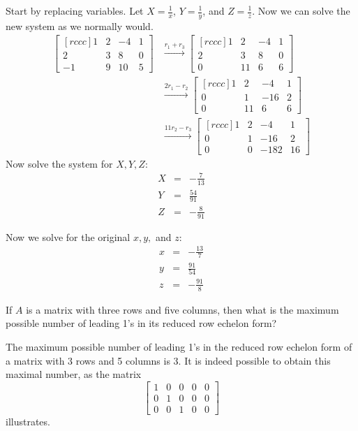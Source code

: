 \begin{solution}
Start by replacing variables.  Let $X = \frac{1}{x}$, $Y = \frac{1}{y}$, and $Z = \frac{1}{z}.$ Now we can solve the new system as we normally would.
\newline
\begin{eqnarray*}
\begin{bmatrix}[rccc]
1&2&-4&1\\
2&3&8&0\\
-1&9&10&5
\end{bmatrix}
&\xrightarrow[]{r_1 + r_3}
\begin{bmatrix}[rccc]
1&2&-4&1\\
2&3&8&0\\
0&11&6&6
\end{bmatrix}\\
&\xrightarrow[]{2r_1 - r_2}
\begin{bmatrix}[rccc]
1&2&-4&1\\
0&1&-16&2\\
0&11&6&6
\end{bmatrix}\\
&\xrightarrow[]{11r_2 - r_3}
\begin{bmatrix}[rccc]
1&2&-4&1\\
0&1&-16&2\\
0&0&-182&16
\end{bmatrix}
\end{eqnarray*}
\newline
Now solve the system for $X, Y, Z$:
\begin{eqnarray*}
X&=&-\frac{7}{13} \\
Y&=&\frac{54}{91} \\
Z&=&-\frac{8}{91} 
\end{eqnarray*}

Now we solve for the original $x, y,$ and $z$:
\begin{eqnarray*}
x&=&-\frac{13}{7} \\
y&=&\frac{91}{54} \\
z&=&-\frac{91}{8} 
\end{eqnarray*}
\end{solution}
\ii
\noindent If $A$ is a matrix with three rows and five columns, then what is the maximum possible number of leading 1's in its reduced row echelon form?
\\
\begin{solution}
\noindent The maximum possible number of leading 1's in the reduced row echelon form of a matrix with 3 rows and 5 columns is 3. It is indeed possible to obtain this maximal number, as the matrix 
\[
\begin{bmatrix}
1&0&0&0&0\\
0&1&0&0&0\\
0&0&1&0&0
\end{bmatrix}
\]
illustrates. 
\end{solution}
